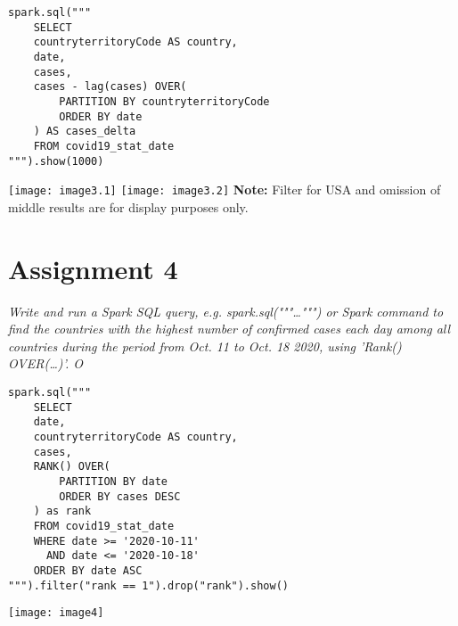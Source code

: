 \documentclass[]{article}
\begin{document}
\begin{verbatim}
spark.sql("""
	SELECT
	countryterritoryCode AS country,
	date,
	cases,
	cases - lag(cases) OVER(
		PARTITION BY countryterritoryCode
		ORDER BY date
	) AS cases_delta
	FROM covid19_stat_date
""").show(1000)
\end{verbatim}
\texttt{[image: image3.1]} %
\texttt{[image: image3.2]} %
\textbf{Note:} Filter for USA and omission of middle results are for display purposes only.

\section*{Assignment 4}
\emph{ Write and run a Spark SQL query, e.g. spark.sql("""\ldots""") or Spark command to find the 	countries with the highest number of confirmed cases each day among all countries during the period from Oct. 11 to Oct. 18 2020, using 'Rank() OVER(\ldots)'. O }

\begin{verbatim}
spark.sql("""
	SELECT
	date,
	countryterritoryCode AS country,
	cases,
	RANK() OVER(
		PARTITION BY date
		ORDER BY cases DESC
	) as rank
	FROM covid19_stat_date
	WHERE date >= '2020-10-11'
	  AND date <= '2020-10-18'
	ORDER BY date ASC
""").filter("rank == 1").drop("rank").show()
\end{verbatim}
\texttt{[image: image4]} %
\end{document}
